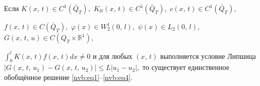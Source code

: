\begin{theorem}

 Если $K(x,\,t)\in C^1(\bar Q_T),$ $K_{tt}(x,\,t)\in C^1(\bar Q_T),$  $c(x,\,t)\in C^1(\bar Q_T),$

 $f(x,\,t)\in C(\bar Q_T),$  $\varphi(x)\in W_2^1(0,\,l),$  $\psi(x)\in L_2 (0,\,l),$ $G(x,\,t,\,u)\in C(Q_T\times \mathbb R^1),$

 $ \displaystyle \int _0^l K(x,\,t) f(x,\,t) dx\not=0$ и для любых $(x,\,t)$ выполняется условие Липшица  $|G(x,\,t,\,u_1)-G(x,\,t,\,u_2)|

 \leq L|u_1-u_2|,$ то существует единственное обобщённое решение \rm \eqref{nvb:eq1}--\eqref{nvb:eq4}.

\end{theorem}



